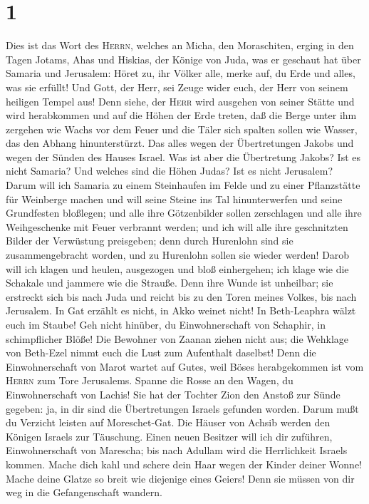 \hypertarget{section}{%
\section{1}\label{section}}

 Dies ist das Wort des \textsc{Herrn}, welches an Micha,
den Moraschiten, erging in den Tagen Jotams, Ahas\textquotesingle{} und
Hiskias, der Könige von Juda, was er geschaut hat über Samaria und
Jerusalem:  Höret zu, ihr Völker alle, merke auf, du Erde
und alles, was sie erfüllt! Und Gott, der Herr, sei Zeuge wider euch,
der Herr von seinem heiligen Tempel aus!  Denn siehe, der
\textsc{Herr} wird ausgehen von seiner Stätte und wird herabkommen und
auf die Höhen der Erde treten,  daß die Berge unter ihm
zergehen wie Wachs vor dem Feuer und die Täler sich spalten sollen wie
Wasser, das den Abhang hinunterstürzt.  Das alles wegen
der Übertretungen Jakobs und wegen der Sünden des Hauses Israel. Was ist
aber die Übertretung Jakobs? Ist es nicht Samaria? Und welches sind die
Höhen Judas? Ist es nicht Jerusalem?  Darum will ich
Samaria zu einem Steinhaufen im Felde und zu einer Pflanzstätte für
Weinberge machen und will seine Steine ins Tal hinunterwerfen und seine
Grundfesten bloßlegen;  und alle ihre Götzenbilder sollen
zerschlagen und alle ihre Weihgeschenke mit Feuer verbrannt werden; und
ich will alle ihre geschnitzten Bilder der Verwüstung preisgeben; denn
durch Hurenlohn sind sie zusammengebracht worden, und zu Hurenlohn
sollen sie wieder werden!  Darob will ich klagen und
heulen, ausgezogen und bloß einhergehen; ich klage wie die Schakale und
jammere wie die Strauße.  Denn ihre Wunde ist unheilbar;
sie erstreckt sich bis nach Juda und reicht bis zu den Toren meines
Volkes, bis nach Jerusalem.  In Gat erzählt es nicht, in
Akko weinet nicht! In Beth-Leaphra wälzt euch im Staube! 
Geh nicht hinüber, du Einwohnerschaft von Schaphir, in schimpflicher
Blöße! Die Bewohner von Zaanan ziehen nicht aus; die Wehklage von
Beth-Ezel nimmt euch die Lust zum Aufenthalt daselbst! 
Denn die Einwohnerschaft von Marot wartet auf Gutes, weil Böses
herabgekommen ist vom \textsc{Herrn} zum Tore Jerusalems.
 Spanne die Rosse an den Wagen, du Einwohnerschaft von
Lachis! Sie hat der Tochter Zion den Anstoß zur Sünde gegeben: ja, in
dir sind die Übertretungen Israels gefunden worden. 
Darum mußt du Verzicht leisten auf Moreschet-Gat. Die Häuser von Achsib
werden den Königen Israels zur Täuschung.  Einen neuen
Besitzer will ich dir zuführen, Einwohnerschaft von Marescha; bis nach
Adullam wird die Herrlichkeit Israels kommen.  Mache dich
kahl und schere dein Haar wegen der Kinder deiner Wonne! Mache deine
Glatze so breit wie diejenige eines Geiers! Denn sie müssen von dir weg
in die Gefangenschaft wandern.

